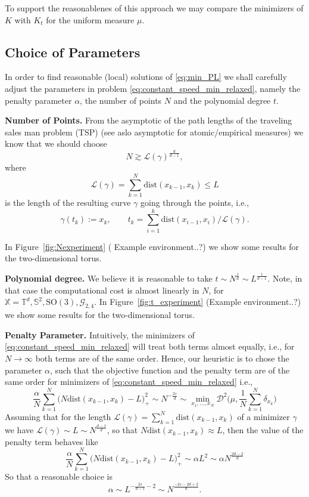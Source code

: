 \documentclass[draft,
a4paper,11pt,DIV=11,%
abstract=on%
]{scrartcl}
\begin{document}
{\color{blue} To support the reasonablenes of this approach we may compare the minimizers of $K$ with $K_{t}$ for the uniform measure $\mu$.}
\subsection{Choice of Parameters}

In order to find reasonable (local) solutions of \eqref{eq:min_PL} we shall carefully adjust the parameters in problem \eqref{eq:constant_speed_min_relaxed}, namely the penalty parameter $\alpha$, the number of points $N$ and the polynomial degree $t$.

\textbf{Number of Points.}
From the asymptotic of the path lengths of the traveling sales man problem (TSP) {\color{blue}(see aslo asymptotic for atomic/empirical measures)}
we know that we should choose
\[
  N \gtrsim \mathcal L(\gamma)^{\frac{d}{d-1}},
\]
where
\[
  \mathcal L(\gamma) = \sum_{k=1}^{N} \mathrm{dist}(x_{k-1},x_{k}) \le L
\]
is the length of the resulting curve $\gamma$ going through the points, i.e.,
\[
 \gamma(t_{k}) := x_{k}, \qquad t_{k} = \sum_{i=1}^{k}  \mathrm{dist}(x_{i-1},x_{i})/ \mathcal L(\gamma).
\]

In Figure~\ref{fig:Nexperiment} {(\color{blue} Example environment..?)} we show some results for the two-dimensional torus. 

\textbf{Polynomial degree.} We believe it is reasonable to take $t \sim N^{\frac1d} \sim L^{\frac{1}{d-1}}$. Note, in that case the computational cost is almost linearly in $N$, for $\mathbb X = \mathbb T^{d}, \mathbb S^{2}, \mathrm{SO(3)}, \mathcal G_{2,4}$. In Figure~\ref{fig:t_experiment} {(\color{blue}Example environment..?)} we show some results for the two-dimensional torus. 

\textbf{Penalty Parameter.}
Intuitively, the minimizers of \eqref{eq:constant_speed_min_relaxed} will treat both terms almost equally, i.e., for $N\to \infty$ both terms are of the same order. Hence, our heuristic is to chose the parameter $\alpha$, such that the objective function and the penalty term are of the same order for minimizers of \eqref{eq:constant_speed_min_relaxed} i.e.,
\begin{equation}
  \label{eq:penalty_behavior}
  \frac{\alpha}{N} \sum_{k=1}^{N} \big(N \mathrm{dist}(x_{k-1},x_{k}) - L \big)_{+}^{2} \sim N^{-\frac{2s}{d}} \sim
  \min_{x_{1},\dots,x_{N}} \mathscr{D}^{2} \Big(\mu, \frac{1}{N} \sum_{k=1}^{N} \delta_{x_{k}}\Big) 
\end{equation}
Assuming that for the length $\mathcal L(\gamma) = \sum_{k=1}^{N}\mathrm{dist}(x_{k-1},x_{k})$ of a minimizer $\gamma$ we have $\mathcal L(\gamma) \sim L \sim N^{\frac{d-1}{d}}$, so that $N \mathrm{dist}(x_{k-1},x_{k}) \approx L$, then the value of the penalty term behaves like
\[
  \frac{\alpha}{N} \sum_{k=1}^{N} \big(N \mathrm{dist}(x_{k-1},x_{k}) - L \big)_{+}^{2} \sim  \alpha L^{2} \sim \alpha N^{\frac{2d-2}{d}}
\]
So that a reasonable choice is
\[
  \alpha \sim L^{-\frac{2s}{d-1}-2} \sim N^{\frac{-2s-2d+2}{d}}.
\]
\end{document}
